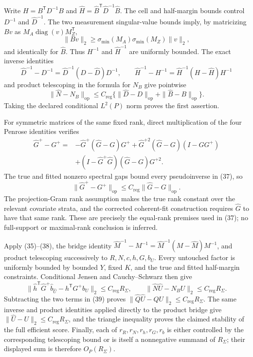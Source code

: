 Write \(H=B^{\mathsf T}D^{-1}B\) and \(\widehat H=\widehat B^{\mathsf T}\widehat D^{-1}\widehat B\).  The cell and half-margin bounds control \(D^{-1}\) and \(\widehat D^{-1}\).  The two measurement singular-value bounds imply, by matricizing \(Bv\) as \(M_A\operatorname{diag}(v)M_Z^{\mathsf T}\),
\[
\|Bv\|_2\geq\sigma_{\min}(M_A)\sigma_{\min}(M_Z)\|v\|_2,
\]
and identically for \(\widehat B\).  Thus \(H^{-1}\) and \(\widehat H^{-1}\) are uniformly bounded.  The exact inverse identities
\[
\widehat D^{-1}-D^{-1}=\widehat D^{-1}(D-\widehat D)D^{-1},
\qquad
\widehat H^{-1}-H^{-1}=\widehat H^{-1}(H-\widehat H)H^{-1} \tag{35}
\]
and product telescoping in the formula for \(N_B\) give pointwise
\[
\|\widehat N-N_B\|_{\mathrm{op}}
\leq C_{\mathrm{reg}}
 \{\|\widehat D-D\|_{\mathrm{op}}+\|\widehat B-B\|_{\mathrm{op}}\}. \tag{36}
\]
Taking the declared conditional \(L^2(P)\) norm proves the first assertion.

For symmetric matrices of the same fixed rank, direct multiplication of the four Penrose identities verifies
\[
\begin{aligned}
\widehat G^+-G^+
={}&-\widehat G^+(\widehat G-G)G^+
+\widehat G^{+2}(\widehat G-G)(I-GG^+)\\
&+(I-\widehat G^+\widehat G)(\widehat G-G)G^{+2}.
\end{aligned} \tag{37}
\]
The true and fitted nonzero spectral gaps bound every pseudoinverse in (37), so
\[
\|\widehat G^+-G^+\|_{\mathrm{op}}
\leq C_{\mathrm{reg}}\|\widehat G-G\|_{\mathrm{op}}. \tag{38}
\]
The projection-Gram rank assumption makes the true rank constant over the relevant covariate strata, and the corrected coherent-fit construction requires \(\widehat G\) to have that same rank.  These are precisely the equal-rank premises used in (37); no full-support or maximal-rank conclusion is inferred.

Apply (35)--(38), the bridge identity
\(\widehat M^{-1}-M^{-1}=\widehat M^{-1}(M-\widehat M)M^{-1}\), and product telescoping successively to \(R,N,c,h,G,b_U\).  Every untouched factor is uniformly bounded by bounded \(Y\), fixed \(K\), and the true and fitted half-margin constraints.  Conditional Jensen and Cauchy--Schwarz then give
\[
\|\widehat h^{\mathsf T}\widehat G^+\widehat b_{\widehat U}
-h^{\mathsf T}G^+b_U\|_2\leq C_{\mathrm{reg}}R_\Sigma,
\qquad
\|\widehat N\widehat U-N_BU\|_2\leq C_{\mathrm{reg}}R_\Sigma. \tag{39}
\]
Subtracting the two terms in (39) proves
\(\|\widehat Q\widehat U-QU\|_2\leq C_{\mathrm{reg}}R_\Sigma\).  The same inverse and product identities applied directly to the product bridge give \(\|\widehat U-U\|_2\leq C_{\mathrm{reg}}R_\Sigma\), and the triangle inequality proves the claimed stability of the full efficient score.  Finally, each of \(r_R,r_N,r_h,r_G,r_b\) is either controlled by the corresponding telescoping bound or is itself a nonnegative summand of \(R_\Sigma\); their displayed sum is therefore \(O_P(R_\Sigma)\).

